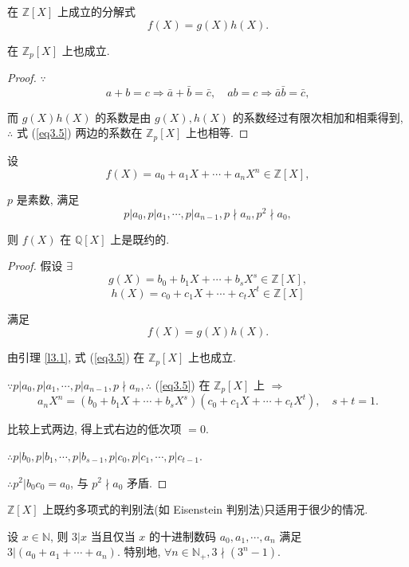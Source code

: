 \documentclass[color=black,device=normal,lang=cn,mode=geye]{elegantnote}
\begin{document}
\begin{lemma}\label{l3.1}
    在 $\mathbb{Z}[X]$ 上成立的分解式
    \begin{equation}\label{eq3.4}
        f(X)=g(X)h(X).
    \end{equation}

    在 $\mathbb{Z}_p[X]$ 上也成立.
\end{lemma}
\begin{proof}
    $\because$
    \[a+b=c\Rightarrow\bar{a}+\bar{b}=\bar{c},\quad ab=c\Rightarrow\bar{a}\bar{b}=\bar{c},\]

    而 $g(X)h(X)$ 的系数是由 $g(X),h(X)$ 的系数经过有限次相加和相乘得到, $\therefore$ 式 (\ref{eq3.5}) 两边的系数在 $\mathbb{Z}_p[X]$ 上也相等.
\end{proof}
\begin{theorem}
    设
    \[f(X)=a_0+a_1X+\cdots+a_nX^n\in\mathbb{Z}[X],\]

    $p$ 是素数, 满足
    \[p|a_0,p|a_1,\cdots,p|a_{n-1},p\nmid a_n,p^2\nmid a_0,\]
    
    则 $f(X)$ 在 $\mathbb{Q}[X]$ 上是既约的.
\end{theorem}
\begin{proof}
    假设 $\exists$
    \[g(X)=b_0+b_1X+\cdots+b_sX^s\in\mathbb{Z}[X],\]
    \[h(X)=c_0+c_1X+\cdots+c_tX^t\in\mathbb{Z}[X]\]
    
    满足
    \begin{equation}\label{eq3.5}
        f(X)=g(X)h(X).
    \end{equation}

    由引理 \ref{l3.1}, 式 (\ref{eq3.5}) 在 $\mathbb{Z}_p[X]$ 上也成立.
    
    $\because p|a_0,p|a_1,\cdots,p|a_{n-1},p\nmid a_n,\therefore$ (\ref{eq3.5}) 在 $\mathbb{Z}_p[X]$ 上 $\Rightarrow$
    \[a_nX^n=(b_0+b_1X+\cdots+b_sX^s)(c_0+c_1X+\cdots+c_tX^t),\quad s+t=1.\]

    比较上式两边, 得上式右边的低次项 $=0$.

    $\therefore p|b_0,p|b_1,\cdots,p|b_{s-1},p|c_0,p|c_1,\cdots,p|c_{t-1}$.

    $\therefore p^2|b_0c_0=a_0$, 与 $p^2\nmid a_0$ 矛盾.
\end{proof}
$\mathbb{Z}[X]$ 上既约多项式的判别法(如 Eisenstein 判别法)只适用于很少的情况.
\begin{lemma}\label{l3.2}
    设 $x\in\mathbb{N}$, 则 $3|x$ 当且仅当 $x$ 的十进制数码 $a_0,a_1,\cdots,a_n$ 满足 $3|(a_0+a_1+\cdots+a_n)$. 特别地, $\forall n\in\mathbb{N}_+,3\nmid(3^n-1)$.
\end{lemma}
\end{document}
